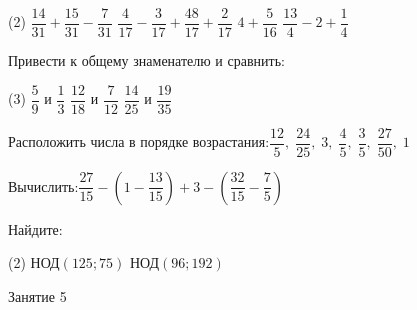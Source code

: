 \begin{class}[number=4]
\begin{listofex}
	\begin{tasks}(2)
		\task \( \dfrac{14}{31}+\dfrac{15}{31}-\dfrac{7}{31} \)
		\task \( \dfrac{4}{17}-\dfrac{3}{17}+\dfrac{48}{17}+\dfrac{2}{17} \)
		\task \( 4+\dfrac{5}{16} \)
		\task \( \dfrac{13}{4}-2+\dfrac{1}{4} \)
	\end{tasks}
	\item Привести к общему знаменателю и сравнить:
	\begin{tasks}(3)
		\task \( \dfrac{5}{9} \) и \( \dfrac{1}{3} \)
		\task \( \dfrac{12}{18} \) и \( \dfrac{7}{12} \)
		\task \( \dfrac{14}{25} \) и \( \dfrac{19}{35} \)
	\end{tasks}
	\item Расположить числа в порядке возрастания:\quad\( \dfrac{12}{5},\;\dfrac{24}{25},\;3,\;\dfrac{4}{5},\;\dfrac{3}{5},\;\dfrac{27}{50},\;1 \)
	\item Вычислить:\quad\( \dfrac{27}{15}-\left( 1-\dfrac{13}{15} \right)+3-\left( \dfrac{32}{15}-\dfrac{7}{5} \right) \)
	\end{listofex}
\end{class}

\begin{homework}[number=2]
	\begin{listofex}
	\item Найдите:
	\begin{tasks}(2)
		\task НОД\( (125; 75) \)
		\task НОД\( (96; 192) \)
	\end{tasks}
	\end{listofex}
\end{homework}

\begin{class}[number=5]
	\begin{listofex}
		\item Занятие 5
	\end{listofex}
\end{class}

